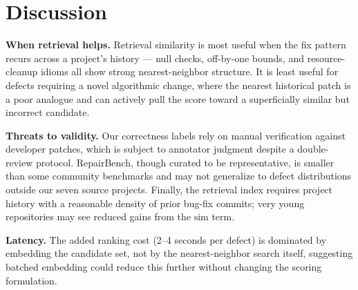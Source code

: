 \section{Discussion}
\label{sec:discussion}
\textbf{When retrieval helps.} Retrieval similarity is most useful when the fix pattern recurs across a project's history --- null checks, off-by-one bounds, and resource-cleanup idioms all show strong nearest-neighbor structure. It is least useful for defects requiring a novel algorithmic change, where the nearest historical patch is a poor analogue and can actively pull the score toward a superficially similar but incorrect candidate.

\textbf{Threats to validity.} Our correctness labels rely on manual verification against developer patches, which is subject to annotator judgment despite a double-review protocol. RepairBench, though curated to be representative, is smaller than some community benchmarks and may not generalize to defect distributions outside our seven source projects. Finally, the retrieval index requires project history with a reasonable density of prior bug-fix commits; very young repositories may see reduced gains from the $\mathrm{sim}$ term.

\textbf{Latency.} The added ranking cost (2--4 seconds per defect) is dominated by embedding the candidate set, not by the nearest-neighbor search itself, suggesting batched embedding could reduce this further without changing the scoring formulation.
